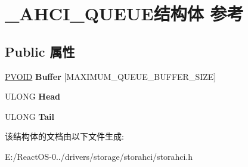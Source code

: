 \hypertarget{struct___a_h_c_i___q_u_e_u_e}{}\section{\+\_\+\+A\+H\+C\+I\+\_\+\+Q\+U\+E\+U\+E结构体 参考}
\label{struct___a_h_c_i___q_u_e_u_e}
\subsection*{Public 属性}
\begin{DoxyCompactItemize}
\item 
\mbox{\label{struct___a_h_c_i___q_u_e_u_e_a50ea91c5ccbcfc0f8b0bf04d2e727c65}} 
\hyperlink{interfacevoid}{P\+V\+O\+ID} {\bfseries Buffer} \mbox{[}M\+A\+X\+I\+M\+U\+M\+\_\+\+Q\+U\+E\+U\+E\+\_\+\+B\+U\+F\+F\+E\+R\+\_\+\+S\+I\+ZE\mbox{]}
\item 
\mbox{\label{struct___a_h_c_i___q_u_e_u_e_a52bc490a87919a758ca45cf2a6e334f6}} 
U\+L\+O\+NG {\bfseries Head}
\item 
\mbox{\label{struct___a_h_c_i___q_u_e_u_e_a0e08d9bbd4407ff9514080c753abecbe}} 
U\+L\+O\+NG {\bfseries Tail}
\end{DoxyCompactItemize}


该结构体的文档由以下文件生成\+:\begin{DoxyCompactItemize}
\item 
E\+:/\+React\+O\+S-\/0../drivers/storage/storahci/storahci.\+h\end{DoxyCompactItemize}
